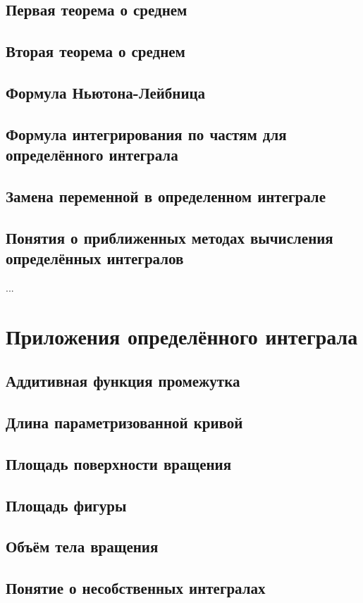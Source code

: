 \subsection{Первая теорема о среднем}
\subsection{Вторая теорема о среднем} 
\subsection{Формула Ньютона-Лейбница}
\subsection{Формула интегрирования по частям для определённого интеграла}
\subsection{Замена переменной в определенном интеграле}
\subsection{Понятия о приближенных методах вычисления определённых интегралов}
...

\section{Приложения определённого интеграла}
\subsection{Аддитивная функция промежутка}
\subsection{Длина параметризованной кривой} 
\subsection{Площадь поверхности вращения}
\subsection{Площадь фигуры}
\subsection{Объём тела вращения}
\subsection{Понятие о несобственных интегралах}


